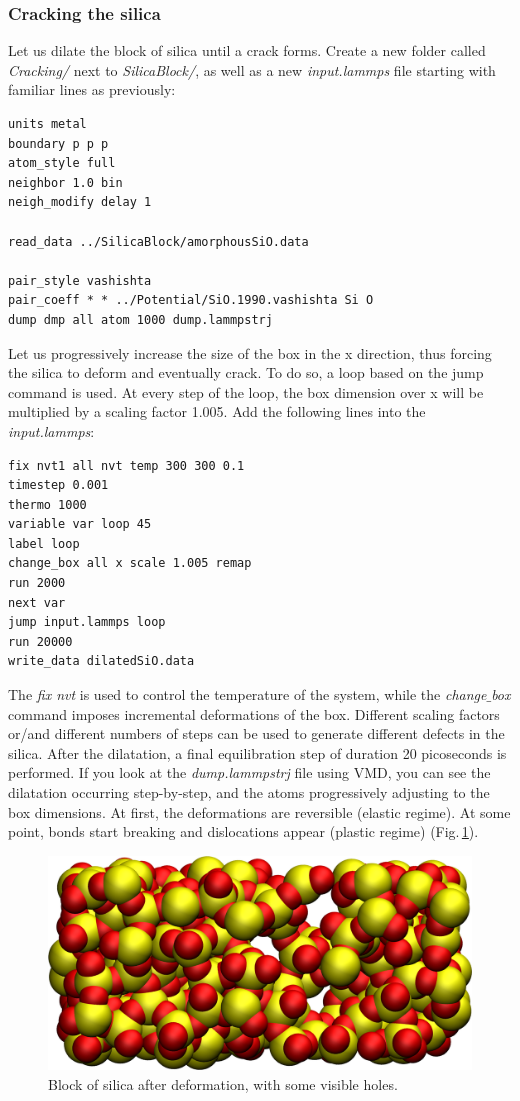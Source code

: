 \documentclass[9pt,tutorial]{livecoms}
\begin{document}
\subsubsection{Cracking the silica}
Let us dilate the block of silica until a crack forms. Create a new folder called \textit{Cracking/} next to \textit{SilicaBlock/}, as well as a new \textit{input.lammps} file starting with familiar lines as previously:
{\normalsize \begin{verbatim}
units metal
boundary p p p
atom_style full
neighbor 1.0 bin
neigh_modify delay 1

read_data ../SilicaBlock/amorphousSiO.data

pair_style vashishta
pair_coeff * * ../Potential/SiO.1990.vashishta Si O
dump dmp all atom 1000 dump.lammpstrj
\end{verbatim}}
Let us progressively increase the size of the box in the x direction, thus forcing the silica to deform and eventually crack. To do so, a loop based on the jump command is used. At every step of the loop, the box dimension over x will be multiplied by a scaling factor 1.005. Add the following lines into the \textit{input.lammps}:
{\normalsize \begin{verbatim}
fix nvt1 all nvt temp 300 300 0.1
timestep 0.001
thermo 1000
variable var loop 45
label loop
change_box all x scale 1.005 remap
run 2000
next var
jump input.lammps loop
run 20000
write_data dilatedSiO.data
\end{verbatim}}
\noindent The \textit{fix nvt} is used to control the temperature of the system, while the \textit{change$\_$box} command
imposes incremental deformations of the box. Different scaling factors or/and different numbers of steps can be used to generate different defects in the silica. After the dilatation, a final equilibration step of duration 20 picoseconds is performed. If you look at the \textit{dump.lammpstrj} file using VMD, you can see the dilatation occurring step-by-step, and the atoms progressively adjusting to the box dimensions. At first, the deformations are reversible (elastic regime). At some point, bonds start breaking and dislocations appear (plastic regime) (Fig.\,\ref{fig:GCMC-cracked}). 

\begin{figure}
\centering
\includegraphics[width=\linewidth]{GCMC-cracked}
\caption{Block of silica after deformation, with some visible holes.}
\label{fig:GCMC-cracked}
\end{figure}
\end{document}
